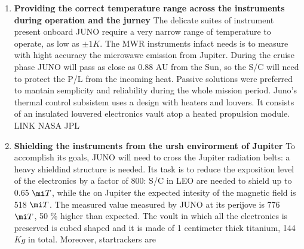 \begin{enumerate}[leftmargin=1.5em]
    \item \textbf{Providing the correct temperature range across the instruments during operation and the jurney}
    \newline The delicate suites of instrument present onboard JUNO require a very narrow range of temperature to operate, as 
    low as $\pm 1 K$. The MWR instruments infact needs is to measure with hight accuracy the microwawe emission from Jupiter. During the cruise phase JUNO will pass as close as 0.88 AU from the Sun, so the S/C will need to protect the P/L from the incoming heat. Passive solutions were preferred to mantain semplicity and reliability during the whole mission period. Juno's thermal control subsistem uses a design with heaters and louvers. It consists of an insulated louvered electronics vault atop a heated propulsion module. 
    LINK NASA JPL 
    \item \textbf{Shielding the instruments from the ursh envirorment of Jupiter}
    \newline To accomplish its goals, JUNO will need to cross the Jupiter radiation belts: a heavy shieldind structure is needed. Its task is to reduce the exposition level of the electronics by a factor of 800: S/C in LEO are needed to shield up to 0.65 $\mi T$, while the on Jupiter the expected intesity of the magnetic field is 518 $\mi T$. The measured value measured by JUNO at its perijove is 776 $\mi T$, 50 \% higher than expected. The voult in which all the electronics is preserved is cubed shaped and it is made of 1 centimeter thick titanium, 144 $Kg$ in total. Moreover, startrackers are 
\end{enumerate}  